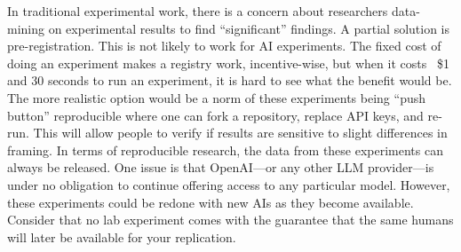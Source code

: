 \documentclass[11pt]{article}
\begin{document}

In traditional experimental work, there is a concern about researchers data-mining on experimental results to find ``significant'' findings. 
A partial solution is pre-registration. 
This is not likely to work for AI experiments. 
The fixed cost of doing an experiment makes a registry work, incentive-wise, but when it costs ~\$1 and 30 seconds to run an experiment, it is hard to see what the benefit would be.
The more realistic option would be a norm of these experiments being ``push button'' reproducible where one can fork a repository, replace API keys, and re-run.
This will allow people to verify if results are sensitive to slight differences in framing.  
In terms of reproducible research, the data from these experiments can
always be released.
One issue is that OpenAI---or any other LLM provider---is under no obligation to continue offering access to any particular model.
However, these experiments could be redone with new AIs as they become available.
Consider that no lab experiment comes with the guarantee that the same humans will later be available for your replication.

\newpage \clearpage 


\end{document}
